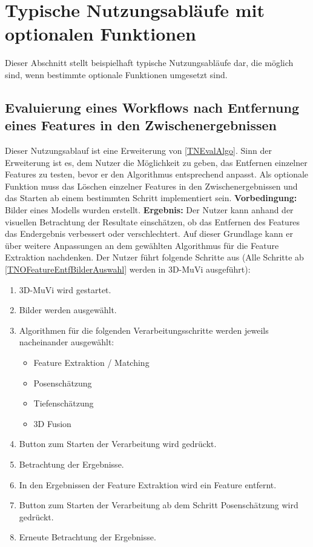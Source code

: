 \section{Typische Nutzungsabläufe mit optionalen Funktionen}

Dieser Abschnitt stellt beispielhaft typische Nutzungsabläufe dar, die möglich sind, wenn bestimmte optionale Funktionen umgesetzt sind.

\subsection{Evaluierung eines Workflows nach Entfernung eines Features in den Zwischenergebnissen}
Dieser Nutzungsablauf ist eine Erweiterung von \ref{TNEvalAlgo}. Sinn der Erweiterung ist es, dem Nutzer die Möglichkeit zu geben, das Entfernen einzelner Features zu testen, bevor er den Algorithmus entsprechend anpasst. Als optionale Funktion muss das Löschen einzelner Features in den Zwischenergebnissen und das Starten ab einem bestimmten Schritt implementiert sein. \newline
\textbf{Vorbedingung:} Bilder eines Modells wurden erstellt. \newline
\textbf{Ergebnis:} Der Nutzer kann anhand der visuellen Betrachtung der Resultate einschätzen, ob das Entfernen des Features das Endergebnis verbessert oder verschlechtert. Auf dieser Grundlage kann er über weitere Anpassungen an dem gewählten Algorithmus für die Feature Extraktion nachdenken. \newline
Der Nutzer führt folgende Schritte aus (Alle Schritte ab \ref{TNOFeatureEntfBilderAuswahl} werden in 3D-MuVi ausgeführt):
\begin{enumerate}
	\item 3D-MuVi wird gestartet.
	\item \label{TNOFeatureEntfBilderAuswahl} Bilder werden ausgewählt.
	\item Algorithmen für die folgenden Verarbeitungsschritte werden jeweils nacheinander ausgewählt:
	\begin{itemize}
		\item Feature Extraktion / Matching
		\item Posenschätzung
		\item Tiefenschätzung
		\item 3D Fusion
	\end{itemize}
	\item Button zum Starten der Verarbeitung wird gedrückt.
	\item Betrachtung der Ergebnisse.
	\item In den Ergebnissen der Feature Extraktion wird ein Feature entfernt.
	\item Button zum Starten der Verarbeitung ab dem Schritt Posenschätzung wird gedrückt.
	\item Erneute Betrachtung der Ergebnisse.
\end{enumerate}
